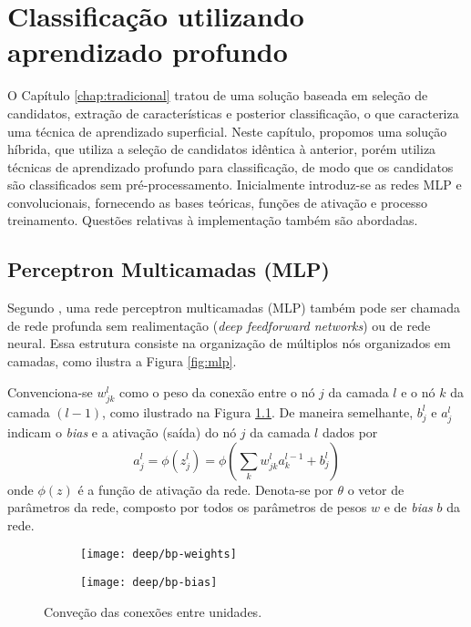\chapter{Classificação utilizando aprendizado profundo} \label{chap:class-profundo}
O Capítulo \ref{chap:tradicional} tratou de uma solução baseada em seleção de candidatos, extração de características e posterior classificação, o que caracteriza uma técnica de aprendizado superficial. Neste capítulo, propomos uma solução híbrida, que utiliza a seleção de candidatos idêntica à anterior, porém utiliza técnicas de aprendizado profundo para classificação, de modo que os candidatos são classificados sem pré-processamento. Inicialmente introduz-se as redes MLP e convolucionais, fornecendo as bases teóricas, funções de ativação e processo treinamento.  Questões relativas à implementação também são abordadas.

\section{Perceptron Multicamadas (MLP)}

Segundo \cite{DLbook}, uma rede perceptron multicamadas (MLP) também pode ser chamada de rede profunda sem realimentação (\textit{deep feedforward networks}) ou de rede neural. Essa estrutura consiste na organização de múltiplos nós organizados em camadas, como ilustra a Figura \ref{fig:mlp}. 
 
Convenciona-se $w_{jk}^l$ como o peso da conexão entre o nó $j$ da camada $l$ e o nó $k$ da camada $(l-1)$, como ilustrado na Figura \ref{fig:bp}. De maneira semelhante, $b^l_j$ e $a^l_j$ indicam o \textit{bias} e a ativação (saída) do nó $j$ da camada $l$ dados por
\begin{equation}
a^l_j = \phi (z^l_j) =\phi \left( \sum_k w_{jk}^l a_k^{l-1} + b_j^l \right)
\end{equation}
onde $\phi(z)$ é a função de ativação da rede. Denota-se por $\theta$ o vetor de parâmetros da rede, composto por todos os parâmetros de pesos $w$ e de \textit{bias} $b$ da rede.

\begin{figure}
\centering
\begin{subfigure}{.5\textwidth}
  \centering
  \texttt{[image: deep/bp-weights]}
\end{subfigure}%
\begin{subfigure}{.5\textwidth}
  \centering
  \texttt{[image: deep/bp-bias]}
\end{subfigure}
\caption{Conveção das conexões entre unidades.}
\label{fig:bp}
\end{figure}

